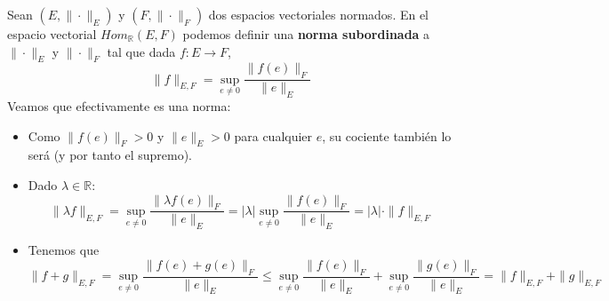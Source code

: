     \begin{defin}
    Sean $(E,\|\cdot \|_E)$ y $(F,\|\cdot\|_F)$ dos espacios vectoriales normados. En el espacio vectorial $Hom_{\mathbb R}(E,F)$ podemos definir una \textbf{norma subordinada} a $\|\cdot\|_E$ y $\|\cdot\|_F$ tal que dada $f:E \longrightarrow F$, 
    $$\|f\|_{E,F}=\sup_{e \neq 0} \dfrac{\|f(e)\|_{F}}{\|e\|_{E}}$$
    Veamos que efectivamente es una norma: \vspace{-5mm}
    \begin{itemize}
    \item[a)] Como $\|f(e)\|_F >0$ y $\|e\|_E>0$ para cualquier $e$, su cociente también lo será (y por tanto el supremo).
    \item[b)] Dado $\lambda\in \mathbb{R}$:
    $$\|\lambda f\|_{E,F}=\sup_{e \neq 0} \dfrac{\|\lambda f(e)\|_{F}}{\|e\|_{E}}=|\lambda| \sup_{e \neq 0} \dfrac{\|f(e)\|_{F}}{\|e\|_{E}}=|\lambda|\cdot \|f\|_{E,F}$$
    \item[c)] Tenemos que
    $$\|f+g\|_{E,F}=\sup_{e \neq 0} \dfrac{\|f(e)+g(e)\|_{F}}{\|e\|_{E}} \leq \sup_{e \neq 0} \dfrac{\|f(e)\|_{F}}{\|e\|_{E}}+\sup_{e \neq 0} \dfrac{\|g(e)\|_{F}}{\|e\|_{E}}=\|f\|_{E,F}+\|g\|_{E,F}$$
    \end{itemize}
    \end{defin}
    
